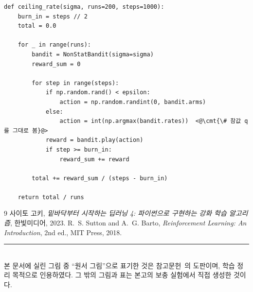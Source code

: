 \documentclass[11pt,a4paper]{article}
\newcommand{\cmt}[1]{\textcolor{codecm}{#1}}   %
\begin{document}
\begin{lstlisting}[basicstyle=\ttfamily\footnotesize,caption={성능 상한 측정 (\texttt{s06\_\allowbreak alpha\_\allowbreak comparison.py})},label={lst:ceiling}]
def ceiling_rate(sigma, runs=200, steps=1000):
    burn_in = steps // 2
    total = 0.0

    for _ in range(runs):
        bandit = NonStatBandit(sigma=sigma)
        reward_sum = 0

        for step in range(steps):
            if np.random.rand() < epsilon:
                action = np.random.randint(0, bandit.arms)
            else:
                action = int(np.argmax(bandit.rates))  <@\cmt{\# 참값 q를 그대로 봄}@>
            reward = bandit.play(action)
            if step >= burn_in:
                reward_sum += reward

        total += reward_sum / (steps - burn_in)

    return total / runs
\end{lstlisting}

\begin{thebibliography}{9}
사이토 고키, \emph{밑바닥부터 시작하는 딥러닝 4: 파이썬으로 구현하는 강화 학습 알고리즘}, 한빛미디어, 2023.
R.~S. Sutton and A.~G. Barto, \emph{Reinforcement Learning: An Introduction}, 2nd ed., MIT Press, 2018.
\end{thebibliography}

\vspace{4mm}
\noindent\rule{\linewidth}{0.4pt}\\
\footnotesize
본 문서에 실린 그림 중 ``원서 그림''으로 표기한 것은 참고문헌~\cite{dlfs4}의 도판이며, 학습 정리 목적으로
인용하였다. 그 밖의 그림과 표는 본고의 보충 실험에서 직접 생성한 것이다.
\end{document}
